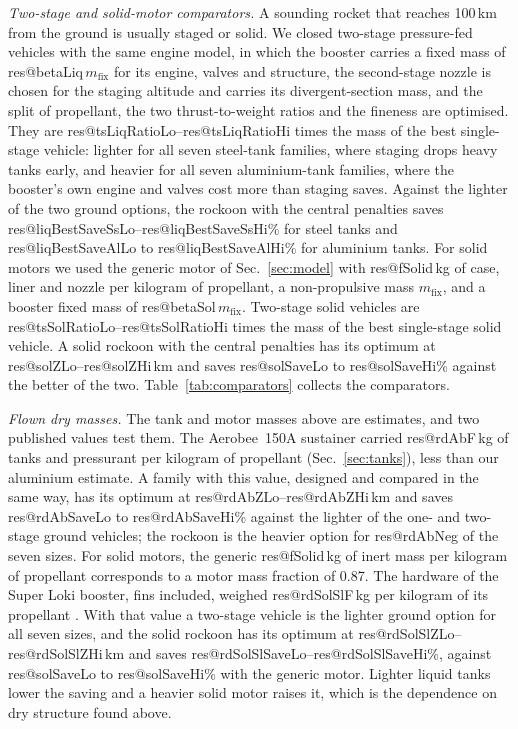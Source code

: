 \documentclass[11pt,a4paper]{article}
\makeatletter
\newcommand{\R}[1]{\csname res@#1\endcsname}
\makeatother
\begin{document}
\emph{Two-stage and solid-motor comparators.} A sounding rocket that reaches 100\,km from the ground is usually staged or solid. We closed two-stage pressure-fed vehicles with the same engine model, in which the booster carries a fixed mass of \R{betaLiq}\,$m_{\mathrm{fix}}$ for its engine, valves and structure, the second-stage nozzle is chosen for the staging altitude and carries its divergent-section mass, and the split of propellant, the two thrust-to-weight ratios and the fineness are optimised. They are \R{tsLiqRatioLo}--\R{tsLiqRatioHi} times the mass of the best single-stage vehicle: lighter for all seven steel-tank families, where staging drops heavy tanks early, and heavier for all seven aluminium-tank families, where the booster's own engine and valves cost more than staging saves. Against the lighter of the two ground options, the rockoon with the central penalties saves \R{liqBestSaveSsLo}--\R{liqBestSaveSsHi}\% for steel tanks and \R{liqBestSaveAlLo} to \R{liqBestSaveAlHi}\% for aluminium tanks. For solid motors we used the generic motor of Sec.~\ref{sec:model} with \R{fSolid}\,kg of case, liner and nozzle per kilogram of propellant, a non-propulsive mass $m_{\mathrm{fix}}$, and a booster fixed mass of \R{betaSol}\,$m_{\mathrm{fix}}$. Two-stage solid vehicles are \R{tsSolRatioLo}--\R{tsSolRatioHi} times the mass of the best single-stage solid vehicle. A solid rockoon with the central penalties has its optimum at \R{solZLo}--\R{solZHi}\,km and saves \R{solSaveLo} to \R{solSaveHi}\% against the better of the two. Table~\ref{tab:comparators} collects the comparators.

\emph{Flown dry masses.} The tank and motor masses above are estimates, and two published values test them. The Aerobee~150A sustainer carried \R{rdAbF}\,kg of tanks and pressurant per kilogram of propellant (Sec.~\ref{sec:tanks}), less than our aluminium estimate. A family with this value, designed and compared in the same way, has its optimum at \R{rdAbZLo}--\R{rdAbZHi}\,km and saves \R{rdAbSaveLo} to \R{rdAbSaveHi}\% against the lighter of the one- and two-stage ground vehicles; the rockoon is the heavier option for \R{rdAbNeg} of the seven sizes. For solid motors, the generic \R{fSolid}\,kg of inert mass per kilogram of propellant corresponds to a motor mass fraction of 0.87. The hardware of the Super Loki booster, fins included, weighed \R{rdSolSlF}\,kg per kilogram of its propellant \cite{bollermann1968}. With that value a two-stage vehicle is the lighter ground option for all seven sizes, and the solid rockoon has its optimum at \R{rdSolSlZLo}--\R{rdSolSlZHi}\,km and saves \R{rdSolSlSaveLo}--\R{rdSolSlSaveHi}\%, against \R{solSaveLo} to \R{solSaveHi}\% with the generic motor. Lighter liquid tanks lower the saving and a heavier solid motor raises it, which is the dependence on dry structure found above.
\end{document}

